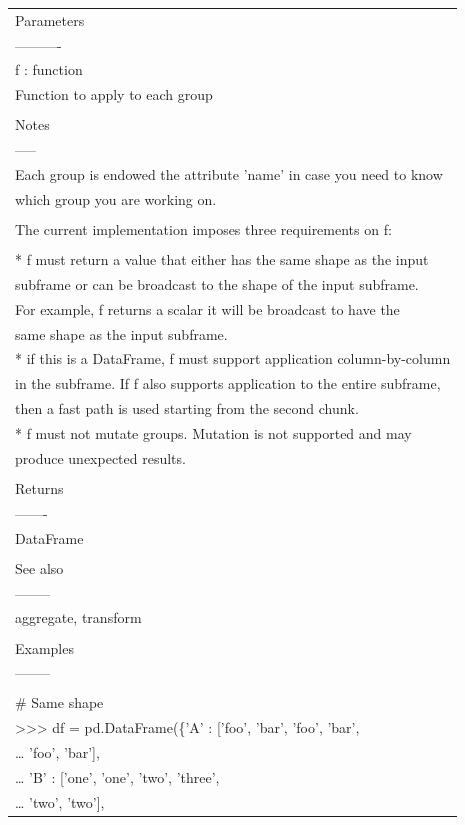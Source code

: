 \documentclass[11pt]{article}
\begin{document}
\begin{enumerate}
\begin{enumerate}
\begin{enumerate}
\begin{center}
\begin{tabular}{l}
Parameters\\
----------\\
f : function\\
Function to apply to each group\\
\\
Notes\\
-----\\
Each group is endowed the attribute 'name' in case you need to know\\
which group you are working on.\\
\\
The current implementation imposes three requirements on f:\\
\\
* f must return a value that either has the same shape as the input\\
subframe or can be broadcast to the shape of the input subframe.\\
For example, f returns a scalar it will be broadcast to have the\\
same shape as the input subframe.\\
* if this is a DataFrame, f must support application column-by-column\\
in the subframe. If f also supports application to the entire subframe,\\
then a fast path is used starting from the second chunk.\\
* f must not mutate groups. Mutation is not supported and may\\
produce unexpected results.\\
\\
Returns\\
-------\\
DataFrame\\
\\
See also\\
--------\\
aggregate, transform\\
\\
Examples\\
--------\\
\\
\# Same shape\\
>>> df = pd.DataFrame(\{'A' : ['foo', 'bar', 'foo', 'bar',\\
\ldots{}                           'foo', 'bar'],\\
\ldots{}                    'B' : ['one', 'one', 'two', 'three',\\
\ldots{}                          'two', 'two'],\\

\end{tabular}
\end{center}
\end{enumerate}
\end{enumerate}
\end{enumerate}
\end{document}
